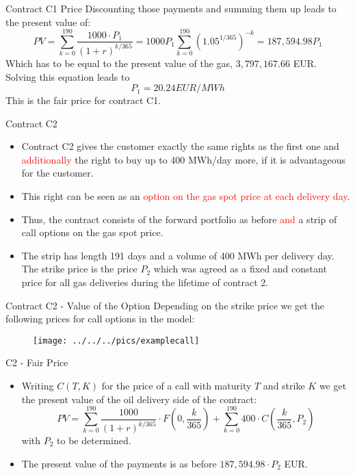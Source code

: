 {Contract C1 Price}
Discounting those payments and summing them up leads to the present value of:
$$
	PV = \sum_{k=0}^{190}{\frac{1000 \cdot P_1}{(1 + r)^{k/365}}} = 1000 P_1 \sum_{k=0}^{190} (1.05^{1/365})^{-k} = 187,594.98 P_1
$$
Which has to be equal to the present value of the gas, $3,797,167.66$ EUR. Solving this equation leads to
$$
	P_1 = 20.24 EUR/MWh
$$
This is the fair price for contract C1.


{Contract C2}
\begin{itemize}
\item<1-> Contract C2 gives the customer exactly the same rights as the first one and \textcolor{red}{additionally} the right to buy up to 400 MWh/day more, if it is advantageous for the customer.
\item<2-> This right can be seen as an \textcolor{red}{option on the gas spot price at each delivery day}.
\item<3-> Thus, the contract consists of the forward portfolio as before \textcolor{red}{and} a strip of call options on the gas spot price.
\item<4-> The strip has length 191 days and a volume of 400 MWh per delivery day. The strike price is the price $P_2$ which was agreed as a fixed and constant price for all gas deliveries during the lifetime of contract 2.
\end{itemize}

{Contract C2 - Value of the Option}
Depending on the strike price we get the following prices for call options in the model:
\begin{figure}
	\centering
		\texttt{[image: ../../../pics/examplecall]}
	\label{fig:examplecall}
\end{figure}

{C2 - Fair Price}
\begin{itemize}
\item<1->
Writing $C(T,K)$ for the price of a call with maturity $T$ and strike $K$ we get the present value of the oil delivery side of the contract:
$$
	PV = \sum_{k=0}^{190} \frac{1000}{(1+r)^{k/365}} \cdot F(0,\frac k {365}) + \sum_{k=0}^{190} 400 \cdot C(\frac k {365},P_2)
$$
with $P_2$ to be determined.
\item<2-> The present value of the payments is as before $187,594.98 \cdot P_2$ EUR.
\end{itemize}

